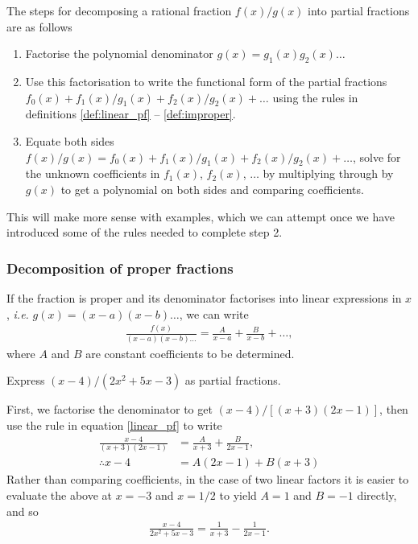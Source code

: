 The steps for decomposing a rational fraction $f(x)/g(x)$ into partial fractions are as follows
\begin{enumerate}
    \item Factorise the polynomial denominator $g(x) = g_1(x)g_2(x)\ldots$
    \item Use this factorisation to write the functional form of the partial fractions $f_0(x) + f_1(x)/g_1(x) + f_2(x)/g_2(x) + \ldots$ using the rules in definitions \ref{def:linear_pf} -- \ref{def:improper}. 
    \item Equate both sides $f(x)/g(x) = f_0(x) + f_1(x)/g_1(x) + f_2(x)/g_2(x) + \ldots$, solve for the unknown coefficients in $f_1(x)$, $f_2(x)$, $\ldots$ by multiplying through by $g(x)$ to get a polynomial on both sides and comparing coefficients.
\end{enumerate}
This will make more sense with examples, which we can attempt once we have introduced some of the rules needed to complete step 2.

\subsubsection{Decomposition of proper fractions}
\label{sec:proper_fracs}

If the fraction is proper and its denominator factorises into linear expressions in $x$, \emph{i.e.} $g(x) = (x-a)(x-b)\ldots$, we can write
\begin{align}
    \label{linear_pf} \frac{f(x)}{(x-a)(x-b)\ldots} = \frac{A}{x-a} + \frac{B}{x-b} + \ldots ,
\end{align}
where $A$ and $B$ are constant coefficients to be determined. 

\begin{example}
    Express $(x-4)/(2x^2+5x-3)$ as partial fractions.
\end{example}
\begin{solution}
First, we factorise the denominator to get $(x - 4)/[(x+3)(2x-1)]$, then use the rule in equation \eqref{linear_pf} to write
\begin{align*}
    \frac{x - 4}{(x+3)(2x-1)} &= \frac{A}{x+3} + \frac{B}{2x-1},\\
    \therefore x-4 &= A(2x-1) + B(x+3)
\end{align*}
Rather than comparing coefficients, in the case of two linear factors it is easier to evaluate the above at $x=-3$ and $x=1/2$ to yield $A = 1$ and $B = -1$ directly, and so
\begin{align*}
    \frac{x-4}{2x^2+5x-3} = \frac{1}{x+3} - \frac{1}{2x-1}.
\end{align*}
\end{solution}

